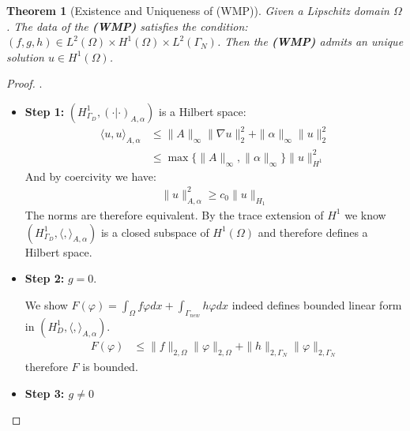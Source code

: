 \documentclass[a4paper,11pt,oneside,fleqn]{book}
\newtheorem{theorem}{Theorem}[section]
\theoremstyle{definition}
\theoremstyle{remark}
\begin{document}
\begin{theorem}[Existence and Uniqueness of (WMP)]
	Given a Lipschitz domain $\Omega$. The data of the \textbf{(WMP)} satisfies the condition: $(f, g, h) \in L^2(\Omega) \times H^1(\Omega) \times L^2(\Gamma_N)$. Then the \textbf{(WMP)} admits an unique solution $u \in H^1(\Omega)$.
\end{theorem}
\begin{proof}.
\begin{itemize}
	\item \textbf{Step 1:} $(H^1_{\Gamma_D}, ( \cdot| \cdot )_{A, \alpha})$ is a Hilbert space:
	\begin{align*}
		\langle u, u \rangle_{A, \alpha} &\leq \|A\|_\infty \|\nabla u\|^2_2 + \|\alpha\|_\infty \|u\|_2^2\\
		&\leq \max\{\|A\|_\infty, \|\alpha\|_\infty\} \|u\|^2_{H^1}
	\end{align*} 
	And by coercivity we have:
	\begin{align*}
		\|u\|_{A, \alpha}^2 \geq c_0 \|u\|_{H_1}
	\end{align*}
	The norms are therefore equivalent. By the trace extension of $H^1$ we know $(H^1_{\Gamma_D}, \langle, \rangle_{A, \alpha})$ is a closed subspace of $H^1(\Omega)$ and therefore defines a Hilbert space.
	\item \textbf{Step 2:} $g = 0$. \par 
	We show $F(\varphi) = \int_\Omega f\varphi dx + \int_{\Gamma_{new}} h \varphi dx$ indeed defines bounded linear form in $(H^1_D, \langle, \rangle_{A, \alpha})$.
	\begin{align*}
		F(\varphi) &\leq \|f\|_{2, \Omega} \|\varphi\|_{2, \Omega} + \|h\|_{2, \Gamma_N} \|\varphi\|_{2, \Gamma_N}
	\end{align*}
	therefore $F$ is bounded.
	\item \textbf{Step 3: $g \neq 0$}
\end{itemize}	
\end{proof}
\end{document}
